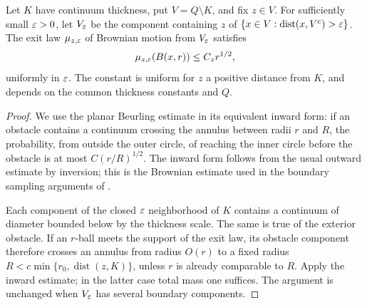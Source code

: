 \begin{lemma}\label{t:exit}
Let $K$ have continuum thickness, put $V=Q\setminus K$, and fix $z\in V$.
For sufficiently small $\varepsilon>0$, let $V_\varepsilon$ be the component containing
$z$ of $\{x\in V:\operatorname{dist}(x,V^c)>\varepsilon\}$.  The exit law
$\mu_{z,\varepsilon}$ of Brownian motion from $V_\varepsilon$ satisfies
\begin{equation}\label{t:exit-frostman}
 \mu_{z,\varepsilon}(B(x,r))\le C_z r^{1/2},
\end{equation}
uniformly in $\varepsilon$.  The constant is uniform for $z$ a positive distance
from $K$, and depends on the common thickness constants and $Q$.
\end{lemma}
\begin{proof}
We use the planar Beurling estimate in its equivalent inward form: if an
obstacle contains a continuum crossing the annulus between radii $r$ and
$R$, the probability, from outside the outer circle, of reaching the
inner circle before the obstacle is at most $C(r/R)^{1/2}$.
The inward form follows from the usual outward estimate by inversion;
this is the Brownian estimate used in the boundary sampling arguments of
\cite{SSdiscrete}.

Each component of the closed $\varepsilon$ neighborhood of $K$ contains a
continuum of diameter bounded below by the thickness scale.  The same is
true of the exterior obstacle.  If an $r$-ball meets the support of the
exit law, its obstacle component therefore crosses an annulus from
radius $O(r)$ to a fixed radius
$R<c\min\{r_0,\operatorname{dist}(z,K)\}$, unless $r$ is already
comparable to $R$.  Apply the inward estimate; in the latter case total
mass one suffices.  The argument is unchanged when $V_\varepsilon$ has several
boundary components.
\end{proof}

